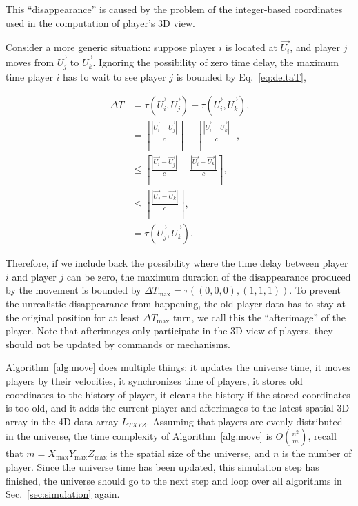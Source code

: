 \documentclass{svproc}
\begin{document}
This ``disappearance'' is caused by the problem of the integer-based coordinates used in the computation of player's 3D view.

Consider a more generic situation: suppose player $i$ is located at $\overrightarrow{U_i}$, 
and player $j$ moves from $\overrightarrow{U_j}$ to $\overrightarrow{U_k}$.
Ignoring the possibility of zero time delay, the maximum time player $i$ has to wait to see player $j$
is bounded by Eq.~\ref{eq:deltaT},

\begin{align} ~\label{eq:deltaT}
  \Delta T &= \tau(\overrightarrow{U_i}, \overrightarrow{U_j}) - \tau(\overrightarrow{U_i}, \overrightarrow{U_k}), \\
  &= \left \lceil \frac{|\overrightarrow{U_i} - \overrightarrow{U_j}|}{c} \right \rceil - \left \lceil \frac{|\overrightarrow{U_i} - \overrightarrow{U_k}|}{c} \right \rceil,  \\
  &\leq \left \lceil \frac{|\overrightarrow{U_i} - \overrightarrow{U_j}|}{c} - \frac{|\overrightarrow{U_i} - \overrightarrow{U_k}|}{c} \right \rceil, \\
  &\leq \left \lceil \frac{|\overrightarrow{U_j} - \overrightarrow{U_k}|}{c} \right \rceil, \\
  &=\tau(\overrightarrow{U_j}, \overrightarrow{U_k}).
\end{align}

Therefore, if we include back the possibility where the time delay between player $i$ and player $j$ can be zero,
the maximum duration of the disappearance produced by the movement is bounded by $\Delta T_{\textrm{max}} = \tau((0, 0, 0), (1, 1, 1))$.
To prevent the unrealistic disappearance from happening, the old player data has to stay at the original
position for at least $\Delta T_{\textrm{max}}$ turn, we call this the ``afterimage'' of the player.
Note that afterimages only participate in the 3D view of players, they should not be updated by commands or mechanisms.

Algorithm~\ref{alg:move} does multiple things: it updates the universe time, 
it moves players by their velocities, it synchronizes time of players,
it stores old coordinates to the history of player, it cleans the history if the stored coordinates is too old,
and it adds the current player and afterimages to the latest spatial 3D array in the 4D data array $L_{TXYZ}$.
Assuming that players are evenly distributed in the universe, 
the time complexity of Algorithm~\ref{alg:move} is $O \left(\frac{n^2}{m} \right)$,
recall that $m=X_{\textrm{max}} Y_{\textrm{max}} Z_{\textrm{max}}$ is the spatial size of the universe,
and $n$ is the number of player.
Since the universe time has been updated, this simulation step has finished, 
the universe should go to the next step and loop over all algorithms in Sec.~\ref{sec:simulation} again.
\end{document}

